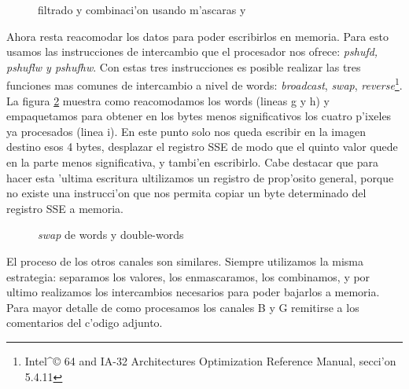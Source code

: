 \begin{figure}[ht]
\caption{filtrado y combinaci'on usando m'ascaras  y }
\label{est:separar-2}
\end{figure}

Ahora resta reacomodar los datos para poder escribirlos en memoria. Para esto usamos las instrucciones de intercambio que el procesador nos ofrece: \textit{pshufd, pshuflw y pshufhw}. Con estas tres instrucciones es posible realizar las tres funciones mas comunes de intercambio a nivel de words: \textit{broadcast}, \textit{swap}, \textit{reverse}\footnote{Intel^{\copyright} 64 and IA-32 Architectures Optimization Reference Manual, secci'on 5.4.11}. La figura \ref{est:separar-3} muestra como reacomodamos los words (lineas g y h) y empaquetamos para obtener en los bytes menos significativos los cuatro p'ixeles ya procesados (linea i). En este punto solo nos queda escribir en la imagen destino esos 4 bytes, desplazar el registro SSE de modo que el quinto valor quede en la parte menos significativa, y tambi'en escribirlo. Cabe destacar que para hacer esta 'ultima escritura ultilizamos un registro de prop'osito general, porque no existe una instrucci'on que nos permita copiar un byte determinado del registro SSE a memoria.

\begin{figure}[ht]
\caption{\textit{swap} de words y double-words}
\label{est:separar-3}
\end{figure}

El proceso de los otros canales son similares. Siempre utilizamos la misma estrategia: separamos los valores, los enmascaramos, los combinamos, y por ultimo realizamos los intercambios necesarios para poder bajarlos a memoria. Para mayor detalle de como procesamos los canales B y G remitirse a los comentarios del c'odigo adjunto.


